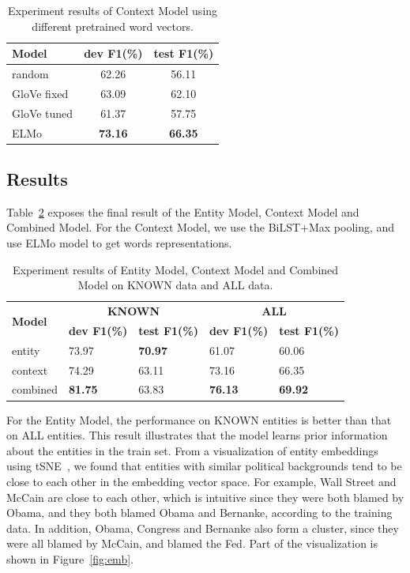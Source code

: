 \documentclass[11pt,a4paper]{article}
\begin{document}
\begin{table}[t]
\centering
\begin{tabular}{l c c} 
\hline
{\bf Model}  & {\bf dev F1(\%) } & {\bf test F1(\%) } \\
\hline\hline
random  &  62.26  & 56.11 \\ 
GloVe fixed  & 63.09  & 62.10 \\
GloVe tuned  & 61.37  & 57.75  \\
ELMo  & {\bf 73.16} & {\bf 66.35} \\
\hline
\end{tabular}
\caption{Experiment results of Context Model using different pretrained word vectors.}
\label{table:pretrain}
\end{table}

\subsection{Results}

Table~\ref{table:finalresult} exposes the final result of the Entity Model, Context Model and Combined Model. For the Context Model, we use the BiLST+Max pooling, and use ELMo model to get words representations.

\begin{table}[t]
\centering
\begin{tabular}{l | p{1cm} p{1cm} | p{1cm} p{1cm}} 
\hline
\multirow{2}{2pt}{\bf Model} & \multicolumn{2}{c}{\bf KNOWN}  & \multicolumn{2}{c}{\bf ALL} \\
 & {\bf dev F1(\%) } & {\bf test F1(\%) } & {\bf dev F1(\%) } & {\bf test F1(\%) } \\
\hline\hline
entity & 73.97 & {\bf 70.97} & 61.07 & 60.06 \\ 
\hline
context & 74.29  & 63.11 & 73.16 & 66.35 \\
\hline
combined & {\bf 81.75}  & 63.83 & {\bf 76.13}  & {\bf 69.92} \\
\hline
\end{tabular}
\caption{Experiment results of Entity Model, Context Model and Combined Model on KNOWN data and ALL data.}
\label{table:finalresult}
\end{table}

For the Entity Model, the performance on KNOWN entities is better than that on ALL entities. This result illustrates that the model learns prior information about the entities in the train set. From a visualization of entity embeddings using tSNE~\cite{maaten2008visualizing}, we found that entities with similar political backgrounds tend to be close to each other in the embedding vector space. For example, Wall Street and McCain are close to each other, which is intuitive since they were both blamed by Obama, and they both blamed Obama and Bernanke, according to the training data. In addition, Obama, Congress and Bernanke also form a cluster, since they were all blamed by McCain, and blamed the Fed. Part of the visualization is shown in Figure~\ref{fig:emb}.
\end{document}
